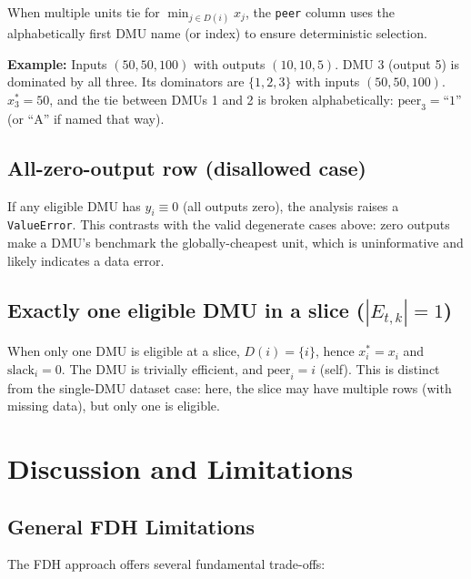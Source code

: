 \documentclass[11pt]{article}
\theoremstyle{definition}
\theoremstyle{plain}
\theoremstyle{remark}
\begin{document}
When multiple units tie for $\min_{j \in D(i)} x_j$, the \texttt{peer} column uses the alphabetically first DMU name (or index) to ensure deterministic selection.

\textbf{Example:} Inputs $(50, 50, 100)$ with outputs $(10, 10, 5)$.
DMU 3 (output 5) is dominated by all three. Its dominators are $\{1, 2, 3\}$ with inputs $(50, 50, 100)$.
$x_3^* = 50$, and the tie between DMUs 1 and 2 is broken alphabetically: $\text{peer}_3 = \text{``1''}$ (or ``A'' if named that way).

\subsection*{All-zero-output row (disallowed case)}

If any eligible DMU has $y_i \equiv 0$ (all outputs zero), the analysis raises a \texttt{ValueError}.
This contrasts with the valid degenerate cases above: zero outputs make a DMU's benchmark the globally-cheapest unit, which is uninformative and likely indicates a data error.

\subsection*{Exactly one eligible DMU in a slice ($|E_{t,k}| = 1$)}

When only one DMU is eligible at a slice, $D(i) = \{i\}$, hence $x_i^* = x_i$ and $\text{slack}_i = 0$.
The DMU is trivially efficient, and $\text{peer}_i = i$ (self).
This is distinct from the single-DMU dataset case: here, the slice may have multiple rows (with missing data), but only one is eligible.

\section{Discussion and Limitations}

\subsection*{General FDH Limitations}

The FDH approach offers several fundamental trade-offs:
\end{document}
